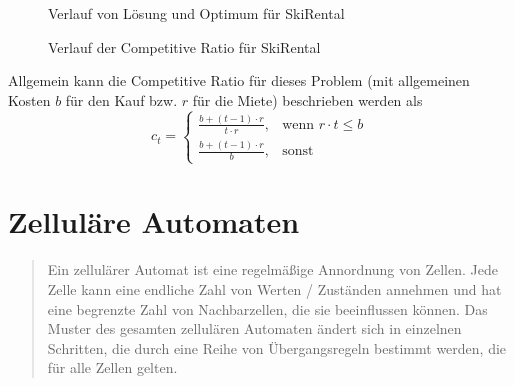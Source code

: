 \documentclass[11pt]{scrreprt} %
\theoremstyle{definition}
\begin{document}
\begin{figure}
\caption{Verlauf von Lösung und Optimum für SkiRental}
\label{fig.skirental}
\begin{center}
\end{center}
\end{figure}

\begin{figure}
\caption{Verlauf der Competitive Ratio für SkiRental}
\label{fig.skirental.c}
\begin{center}
\end{center}
\end{figure}

Allgemein kann die Competitive Ratio für dieses Problem (mit allgemeinen Kosten $b$ für den Kauf bzw. $r$ für die Miete) beschrieben werden als
\[
	c_t = \begin{cases}
		\frac{b+(t-1)\cdot r}{t\cdot r}, & \text{wenn } r\cdot t \le b \\
		\frac{b+(t-1)\cdot r}{b}, & \text{sonst}
	\end{cases}
\]

\section{Zelluläre Automaten}

\begin{quote}Ein zellulärer Automat ist eine regelmäßige Annordnung von Zellen. Jede Zelle kann eine endliche Zahl
von Werten / Zuständen annehmen und hat eine begrenzte Zahl von Nachbarzellen, die sie beeinflussen
können. Das Muster des gesamten zellulären Automaten ändert sich in einzelnen Schritten, die durch eine
Reihe von Übergangsregeln bestimmt werden, die für alle Zellen gelten.\cite{beckmann}\end{quote}
\end{document}
